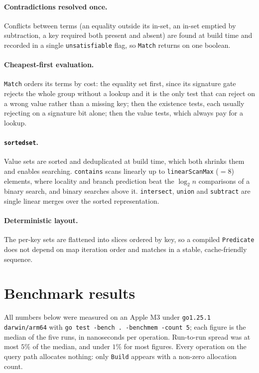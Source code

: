 \documentclass[11pt]{article}
\newcommand{\code}[1]{\texttt{#1}}
\begin{document}
\paragraph{Contradictions resolved once.} Conflicts between terms (an equality
outside its in-set, an in-set emptied by subtraction, a key required both
present and absent) are found at build time and recorded in a single
\code{unsatisfiable} flag, so \code{Match} returns on one boolean.

\paragraph{Cheapest-first evaluation.} \code{Match} orders its terms by cost:
the equality set first, since its signature gate rejects the whole group without
a lookup and it is the only test that can reject on a wrong value rather than a
missing key; then the existence tests, each usually rejecting on a signature bit
alone; then the value tests, which always pay for a lookup.

\paragraph{\code{sortedset}.} Value sets are sorted and deduplicated at build
time, which both shrinks them and enables searching. \code{contains} scans
linearly up to \code{linearScanMax} ($=8$) elements, where locality and branch
prediction beat the $\log_2 n$ comparisons of a binary search, and binary
searches above it. \code{intersect}, \code{union} and \code{subtract} are single
linear merges over the sorted representation.

\paragraph{Deterministic layout.} The per-key sets are flattened into slices
ordered by key, so a compiled \code{Predicate} does not depend on map iteration
order and matches in a stable, cache-friendly sequence.

\section{Benchmark results}

All numbers below were measured on an Apple M3 under \code{go1.25.1
darwin/arm64} with \code{go test -bench . -benchmem -count 5}; each figure is
the median of the five runs, in nanoseconds per operation. Run-to-run spread was
at most $5\%$ of the median, and under $1\%$ for most figures. Every
operation on the query path allocates nothing: only \code{Build} appears with a
non-zero allocation count.
\end{document}
